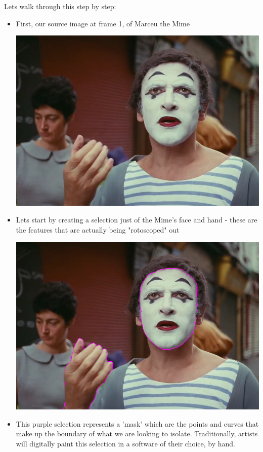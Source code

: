 \documentclass[15pt]{article}
\begin{document}
Lets walk through this step by step:

\begin{itemize}
\item First, our source image at frame 1, of Marceu the Mime
\begin{center}
\includegraphics[width=.9\linewidth]{./roto/Capture.PNG}
\end{center}
\item Lets start by creating a selection just of the Mime's face and hand - these
are the features that are actually being "rotoscoped" out
\begin{center}
\includegraphics[width=.9\linewidth]{./roto/masked.PNG}
\end{center}
\item This purple selection represents a 'mask' which are the points and curves that
make up the boundary of what we are looking to isolate. Traditionally, artists
will digitally paint this selection in a software of their choice, by hand.

\end{itemize}
\end{document}
